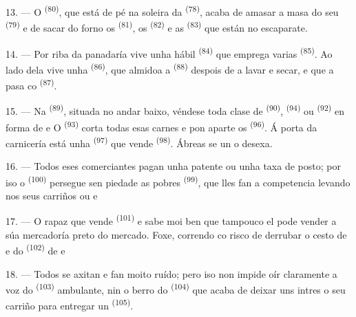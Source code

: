 13. --- O  \textsuperscript{(80)}, que está de pé na soleira da
 \textsuperscript{(78)}, acaba de amasar a masa do seu 
\textsuperscript{(79)} e de sacar do forno os  \textsuperscript{(81)}, os
 \textsuperscript{(82)} e as  \textsuperscript{(83)} que están
no escaparate.

14. --- Por riba da panadaría vive unha hábil 
\textsuperscript{(84)} que emprega varias  \textsuperscript{(85)}. Ao lado
dela vive unha  \textsuperscript{(86)}, que almidoa a
 \textsuperscript{(88)} despois de a lavar e secar, e que a pasa co
 \textsuperscript{(87)}.

\VUsaut{4.0mm}
\VUsaut{3.0mm}

15. --- Na  \textsuperscript{(89)}, situada no andar baixo, véndese toda
clase de  \textsuperscript{(90)},
 \textsuperscript{(94)} ou 
\textsuperscript{(92)} en forma de  e
 O  \textsuperscript{(93)} corta todas
esas carnes e pon aparte os  \textsuperscript{(96)}. Á porta da
carnicería está unha  \textsuperscript{(97)} que vende
 \textsuperscript{(98)}. Ábreas se un o desexa.

16. --- Todos eses comerciantes pagan unha patente ou unha taxa de posto; por iso o
 \textsuperscript{(100)} persegue sen piedade as pobres
 \textsuperscript{(99)}, que lles fan a
competencia levando nos seus carriños  ou
 e

\VUsaut{4.0mm}
\VUsaut{3.0mm}

17. --- O rapaz que vende  \textsuperscript{(101)} e  sabe moi
ben que tampouco el pode vender a súa mercadoría preto do mercado. Foxe, correndo co risco de
derrubar o cesto de   e
 do  \textsuperscript{(102)} de  e

18. --- Todos se axitan e fan moito ruído; pero iso non impide oír claramente a voz do
 \textsuperscript{(103)} ambulante, nin o berro do 
\textsuperscript{(104)} que acaba de deixar uns intres o seu carriño para entregar un
 \textsuperscript{(105)}.

